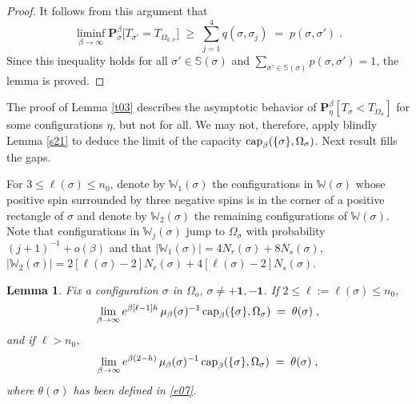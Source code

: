 \documentclass[reqno]{amsart}
\newtheorem{lemma}[theorem]{Lemma}
\begin{document}
\begin{proof}
It follows from this argument that
\begin{equation*}
\liminf_{\beta\to\infty} {{\mathbf P}}^\beta_\sigma \big[ T_{\sigma'} 
= T_{\Omega_{k, \sigma}} \big] \;\ge\; \sum_{j=1}^4 q(\sigma,
\sigma_j) \; =\; p(\sigma, \sigma')\;.
\end{equation*}
Since this inequality holds for all $\sigma'\in {{\mathbb S}}(\sigma)$ and
$\sum_{\sigma'\in {{\mathbb S}}(\sigma)} p(\sigma, \sigma')=1$, the lemma is
proved.
\end{proof}

The proof of Lemma \ref{t03} describes the asymptotic behavior of ${{\mathbf P}}^\beta_\eta [ T_\sigma < T_{\Omega_\sigma}]$ for some configurations
$\eta$, but not for all. We may not, therefore, apply blindly Lemma
\ref{s21} to deduce the limit of the capacity ${{\rm cap}}_\beta(\{\sigma\} ,
\Omega_\sigma)$. Next result fills the gaps.

For $3\le \ell (\sigma) \le n_0$, denote by ${{\mathbb W}}_1(\sigma)$ the
configurations in ${{\mathbb W}}(\sigma)$ whose positive spin surrounded by
three negative spins is in the corner of a positive rectangle of
$\sigma$ and denote by ${{\mathbb W}}_2(\sigma)$ the remaining configurations
of ${{\mathbb W}} (\sigma)$. Note that configurations in ${{\mathbb W}}_j(\sigma)$
jump to $\Omega_\sigma$ with probability $(j+1)^{-1} + o(\beta)$ and
that $|{{\mathbb W}}_1(\sigma)| = 4 N_r(\sigma) + 8 N_s(\sigma)$, $|{{\mathbb W}}_2(\sigma)| = 2[\ell(\sigma)-2] N_r(\sigma) + 4[\ell(\sigma)-2]
N_s(\sigma)$. 

\begin{lemma}
\label{t02}
Fix a configuration $\sigma$ in $\Omega_o$, $\sigma \not = + {{\mathbf 1}}, -
{{\mathbf 1}}$. If $2\le \ell:=\ell(\sigma) \le n_0$,
\begin{equation*}
\lim_{\beta\to\infty}  e^{\beta [\ell -1] h} \, \mu_\beta
(\sigma)^{-1} \, {{\rm cap}}_\beta(\{\sigma\} , \Omega_\sigma) \;=\; 
\theta(\sigma)\;, 
\end{equation*}
and if $\ell > n_0$,
\begin{equation*}
\lim_{\beta\to\infty} e^{\beta (2-h)} \,
\mu_\beta (\sigma)^{-1} \, {{\rm cap}}_\beta(\{\sigma\} , \Omega_\sigma) 
\;=\; \theta(\sigma)\;, 
\end{equation*}
where $\theta(\sigma)$ has been defined in \eqref{e07}.
\end{lemma}
\end{document}
